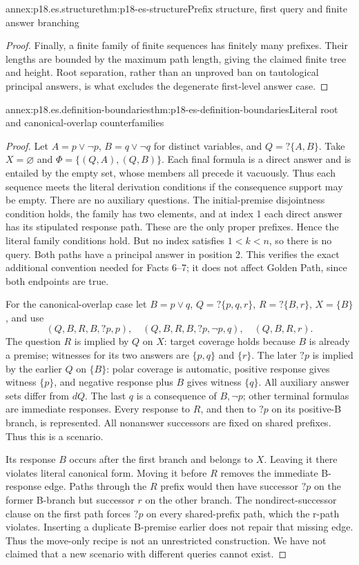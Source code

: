 \begin{annexitem}{annex:p18.es.structure}{thm:p18-es-structure}{Prefix structure, first query and finite answer branching}
\begin{proof}
Finally, a finite family of finite sequences has finitely many prefixes. Their
lengths are bounded by the maximum path length, giving the claimed finite tree
and height. Root separation, rather than an unproved ban on tautological
principal answers, is what excludes the degenerate first-level answer case.
\end{proof}
\end{annexitem}

\begin{annexitem}{annex:p18.es.definition-boundaries}{thm:p18-es-definition-boundaries}{Literal root and canonical-overlap counterfamilies}
\begin{proof}
Let \(A=p\lor\neg p\), \(B=q\lor\neg q\) for distinct variables,
and \(Q=?\{A,B\}\). Take \(X=\varnothing\) and
\(\Phi=\{(Q,A),(Q,B)\}\). Each final formula is a direct answer and
is entailed by the empty set, whose members all precede it vacuously. Thus
each sequence meets the literal derivation conditions if the consequence
support may be empty. There are no auxiliary questions. The initial-premise
disjointness condition holds, the family has two elements, and at index 1
each direct answer has its stipulated response path. These are the only
proper prefixes. Hence the literal family conditions hold. But no index
satisfies \(1<k<n\), so there is no query. Both paths have a principal
answer in position 2. This verifies the exact additional convention needed
for Facts 6--7; it does not affect Golden Path, since both endpoints are true.

For the canonical-overlap case let \(B=p\lor q\),
\(Q=?\{p,q,r\}\), \(R=?\{B,r\}\), \(X=\{B\}\), and use
\[
 (Q,B,R,B,?p,p),\quad
 (Q,B,R,B,?p,\neg p,q),\quad
 (Q,B,R,r).
\]
The question \(R\) is implied by \(Q\) on \(X\): target coverage holds
because \(B\) is already a premise; witnesses for its two answers are
\(\{p,q\}\) and \(\{r\}\). The later \(?p\) is implied by the
earlier \(Q\) on \(\{B\}\): polar coverage is automatic, positive
response gives witness \(\{p\}\), and negative response plus \(B\)
gives witness \(\{q\}\). All auxiliary answer sets differ from \(dQ\).
The last \(q\) is a consequence of \(B,\neg p\); other terminal
formulas are immediate responses. Every response to \(R\), and then to
\(?p\) on its positive-B branch, is represented. All nonanswer successors
are fixed on shared prefixes. Thus this is a scenario.

Its response \(B\) occurs after the first branch and belongs to \(X\).
Leaving it there violates literal canonical form. Moving it before \(R\)
removes the immediate B-response edge. Paths through the \(R\) prefix
would then have successor \(?p\) on the former B-branch but successor
\(r\) on the other branch. The nondirect-successor clause on the first
path forces \(?p\) on every shared-prefix path, which the r-path violates.
Inserting a duplicate B-premise earlier does not repair that missing edge.
Thus the move-only recipe is not an unrestricted construction. We have not
claimed that a new scenario with different queries cannot exist.
\end{proof}
\end{annexitem}

